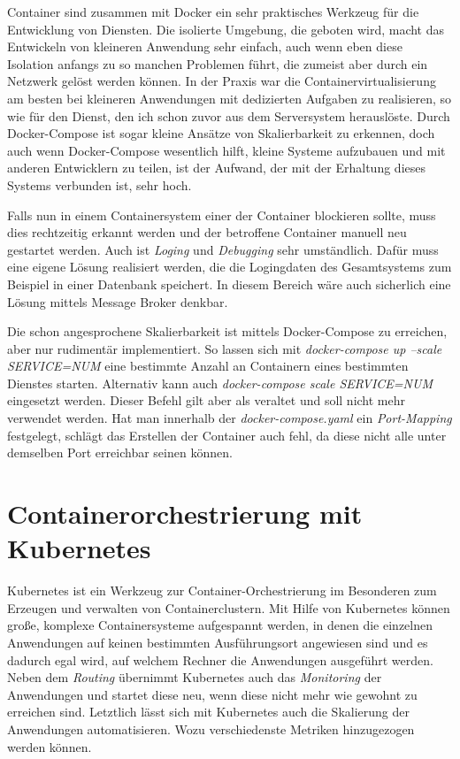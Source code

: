 \documentclass[12pt,a4paper]{scrartcl}
\begin{document}
Container sind zusammen mit Docker ein sehr praktisches Werkzeug für die Entwicklung von Diensten. Die isolierte Umgebung, die geboten wird, macht das Entwickeln von kleineren Anwendung  sehr einfach, auch wenn eben diese Isolation anfangs zu so manchen Problemen führt, die zumeist aber durch ein Netzwerk gelöst werden können. In der Praxis war die Containervirtualisierung am besten bei kleineren Anwendungen mit dedizierten Aufgaben zu realisieren, so wie für den Dienst, den ich schon zuvor aus dem Serversystem herauslöste. Durch Docker-Compose ist sogar kleine Ansätze von Skalierbarkeit zu erkennen, doch auch wenn Docker-Compose wesentlich hilft, kleine Systeme aufzubauen und mit anderen Entwicklern zu teilen, ist der Aufwand, der mit der Erhaltung dieses Systems verbunden ist, sehr hoch.

Falls nun in einem Containersystem einer der Container blockieren sollte, muss dies rechtzeitig erkannt werden und der betroffene Container manuell neu gestartet werden. Auch ist \emph{Loging} und \emph{Debugging} sehr umständlich. Dafür muss eine eigene Lösung realisiert werden, die die Logingdaten des Gesamtsystems zum Beispiel in einer Datenbank speichert. In diesem Bereich wäre auch sicherlich eine Lösung mittels Message Broker denkbar.

Die schon angesprochene Skalierbarkeit ist mittels Docker-Compose zu erreichen, aber nur rudimentär implementiert. So lassen sich mit \emph{docker-compose up --scale SERVICE=NUM} eine bestimmte Anzahl an Containern eines bestimmten Dienstes starten. Alternativ kann auch \emph{docker-compose scale SERVICE=NUM} eingesetzt werden. Dieser Befehl gilt aber als veraltet und soll nicht mehr verwendet werden. Hat man innerhalb der \emph{docker-compose.yaml} ein \emph{Port-Mapping} festgelegt, schlägt das Erstellen der Container auch fehl, da diese nicht alle unter demselben Port erreichbar seinen können.


\newpage
\section{Containerorchestrierung mit Kubernetes} \label{kubernetes}

Kubernetes\cite{k8sWeb} ist ein Werkzeug zur Container-Orchestrierung im Besonderen zum Erzeugen und verwalten von Containerclustern. Mit Hilfe von Kubernetes können große, komplexe Containersysteme aufgespannt werden, in denen die einzelnen Anwendungen auf keinen bestimmten Ausführungsort angewiesen sind und es dadurch egal wird, auf welchem Rechner die Anwendungen ausgeführt werden. Neben dem \emph{Routing} übernimmt Kubernetes auch das \emph{Monitoring} der Anwendungen und startet diese neu, wenn diese nicht mehr wie gewohnt zu erreichen sind. Letztlich lässt sich mit Kubernetes auch die Skalierung der Anwendungen automatisieren. Wozu verschiedenste Metriken hinzugezogen werden können.\cite{k8sOvr}
\end{document}
